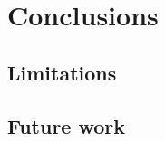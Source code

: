 \chapter{Conclusions}
\label{chp:future_work_and_conclusions}






\section{Limitations}





\section{Future work}









